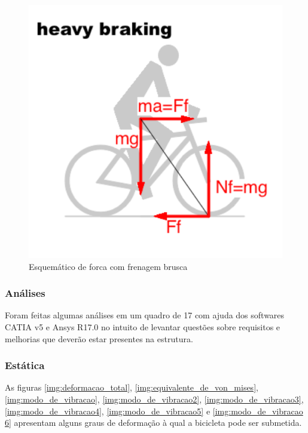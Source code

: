 		\graphicspath{{figuras/}}
		\begin{figure}[h!]
		\centering
		\includegraphics[scale=0.80]{esq_forca_com_frenagem_brusca.png}
		\caption{Esquemático de forca com frenagem brusca}
		\label{img:esq_forca_com_frenagem_brusca}
		\end{figure}

\newpage

	\subsubsection{Análises}
	Foram feitas algumas análises em um quadro de 17 com ajuda dos softwares CATIA v5 e Ansys R17.0 no intuito de levantar questões sobre requisitos e melhorias que deverão estar presentes na estrutura.
	
	\subsubsection{Estática}
	As figuras \ref{img:deformacao_total}, \ref{img:equivalente_de_von_mises}, \ref{img:modo_de_vibracao}, \ref{img:modo_de_vibracao2}, \ref{img:modo_de_vibracao3}, \ref{img:modo_de_vibracao4}, \ref{img:modo_de_vibracao5} e \ref{img:modo_de_vibracao 6} apresentam alguns graus de deformação à qual a bicicleta pode ser submetida. 	
	
